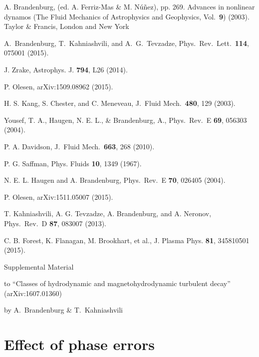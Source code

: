 \documentclass[prl,twocolumn,aps,psfig,showpacs,nofootinbib,nobibnotes,superscriptaddress,preprintnumbers,times]{revtex4}
\newcommand{\arXiv}[2]{, arXiv:#2 (#1).}
\newcommand{\yprd}[3]{, Phys.\ Rev.\ D {\bf #2}, #3 (#1).}
\newcommand{\ypre}[3]{, Phys.\ Rev.\ E {\bf #2}, #3 (#1).}
\newcommand{\yprl}[3]{, Phys.\ Rev.\ Lett.\ {\bf #2}, #3 (#1).}
\newcommand{\yjfm}[3]{, J.\ Fluid Mech.\ {\bf #2}, #3 (#1).}
\newcommand{\yjour}[4]{, #2 {\bf #3}, #4 (#1).}
\newcommand{\ypf}[3]{, Phys. Fluids {\bf #2}, #3 (#1).}
\newcommand{\yapj}[3]{, Astrophys. J. {\bf #2}, #3 (#1).}
\newcommand{\yproc}[4]{, (ed. #4), pp. #2. #3 (#1).}
\begin{document}
\begin{thebibliography}{}
A. Brandenburg\yproc{2003}{269}
{Advances in nonlinear dynamos
(The Fluid Mechanics of Astrophysics and Geophysics, Vol.\ {\bf9})}
{A. Ferriz-Mas \& M. N\'u\~nez}
{Taylor \& Francis, London and New York}

A.~Brandenburg, T.~Kahniashvili, and A.~G.~Tevzadze\yprl{2015}{114}{075001}

J. Zrake\yapj{2014}{794}{L26}

P. Olesen\arXiv{2015}{1509.08962}

H. S. Kang, S. Chester, and C. Meneveau\yjfm{2003}{480}{129}

Yousef, T. A., Haugen, N. E. L., \& Brandenburg, A.\ypre{2004}{69}{056303}

P. A. Davidson\yjfm{2010}{663}{268}

P. G. Saffman\ypf{1967}{10}{1349}

N. E. L. Haugen and A. Brandenburg\ypre{2004}{70}{026405}

P. Olesen\arXiv{2015}{1511.05007}

T. Kahniashvili, A. G. Tevzadze, A. Brandenburg, and A. Neronov\yprd{2013}{87}{083007}

C. B. Forest, K. Flanagan, M. Brookhart, et al.\yjour{2015}{J. Plasma Phys.}{81}{345810501}

\end{thebibliography}

\newpage
\LARGE
\noindent
Supplemental Material

\large
\vspace{1mm}
\noindent
to ``Classes of hydrodynamic and magnetohydrodynamic turbulent decay''
(arXiv:1607.01360)

\normalsize
\vspace{1mm}
\noindent
by A.\ Brandenburg \& T.\ Kahniashvili


\section{Effect of phase errors}
\end{document}
